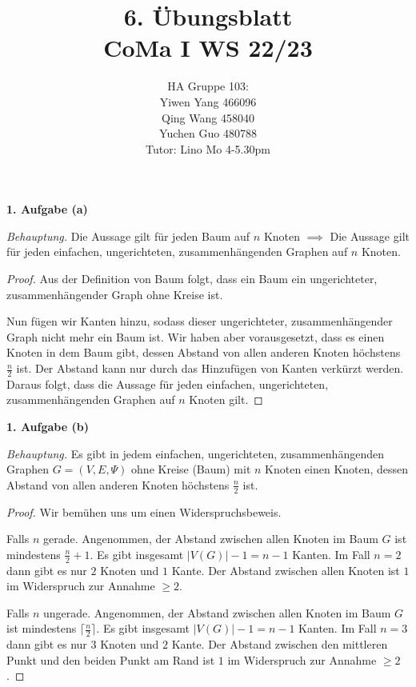 \documentclass[12pt]{extarticle}
\author{HA Gruppe 103: \\Yiwen Yang 466096\\Qing Wang 458040\\Yuchen Guo 480788\\Tutor: Lino Mo 4-5.30pm}
\title{6. Übungsblatt\\\small CoMa I WS 22/23}
\date{}
\begin{document}
\maketitle
\newpage
\textbf{1. Aufgabe (a)}

\textit{Behauptung.}  Die Aussage gilt für jeden Baum auf \(n\) Knoten
\(\implies\) Die Aussage gilt für jeden einfachen, ungerichteten,
zusammenhängenden Graphen auf \(n\) Knoten.

\begin{proof}
  Aus der Definition von Baum folgt, dass ein Baum ein ungerichteter,
  zusammenhängender Graph ohne Kreise ist.

  Nun fügen wir Kanten hinzu, sodass dieser ungerichteter,
  zusammenhängender Graph nicht mehr ein Baum ist.  Wir haben aber
  vorausgesetzt, dass es einen Knoten in dem Baum gibt, dessen Abstand
  von allen anderen Knoten höchstens \(\frac{n}{2}\) ist.  Der Abstand
  kann nur durch das Hinzufügen von Kanten verkürzt werden.  Daraus
  folgt, dass die Aussage für jeden einfachen, ungerichteten,
  zusammenhängenden Graphen auf \(n\) Knoten gilt.
\end{proof}

\textbf{1. Aufgabe (b)}

\textit{Behauptung.}  Es gibt in jedem einfachen, ungerichteten,
zusammenhängenden Graphen \(G = (V, E, \Psi)\) ohne Kreise (Baum) mit \(n\) Knoten einen
Knoten, dessen Abstand von allen anderen Knoten höchstens
\(\frac{n}{2}\) ist.

\begin{proof}
  Wir bemühen uns um einen Widerspruchsbeweis.

  Falls \(n\) gerade.  Angenommen, der Abstand zwischen allen Knoten im
  Baum \(G\) ist mindestens \(\frac{n}{2}+1\).  Es gibt insgesamt $\left|
    V(G) \right|-1=n-1$ Kanten. Im Fall \(n=2\) dann gibt es nur \(2\)
  Knoten und \(1\) Kante.  Der Abstand zwischen allen Knoten ist \(1\) im
  Widerspruch zur Annahme \(\geq 2\).

  Falls \(n\) ungerade.  Angenommen, der Abstand zwischen allen Knoten
  im Baum \(G\) ist mindestens \(\lceil\frac{n}{2}\rceil\). Es gibt insgesamt $\left|
    V(G) \right|-1=n-1$ Kanten. Im Fall \(n=3\) dann gibt es nur \(3\)
  Knoten und \(2\) Kante.  Der Abstand zwischen den mittleren Punkt und
  den beiden Punkt am Rand ist \(1\) im Widerspruch zur Annahme \(\geq 2\).
\end{proof}
\end{document}
